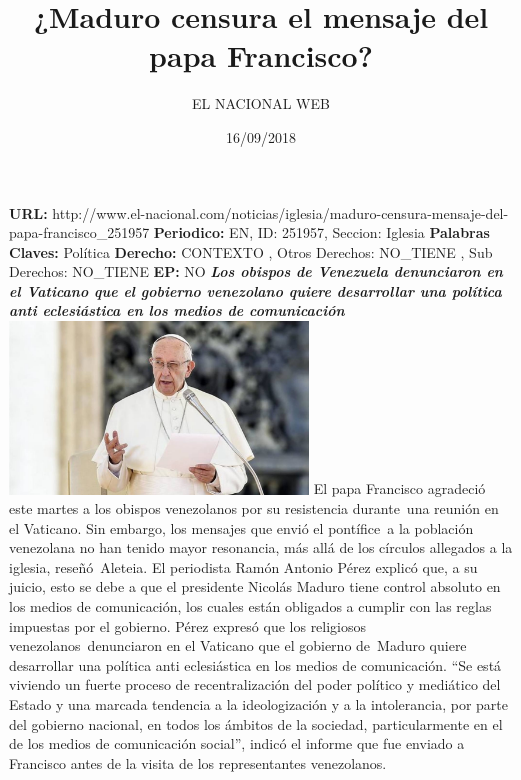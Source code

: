 \documentclass{article}%
\title{\textbf{¿Maduro censura el mensaje del papa Francisco?}}%
\author{EL NACIONAL WEB}%
\date{16/09/2018}%
\begin{document}
%
\normalsize%
\maketitle%
\textbf{URL: }%
http://www.el{-}nacional.com/noticias/iglesia/maduro{-}censura{-}mensaje{-}del{-}papa{-}francisco\_251957\newline%
%
\textbf{Periodico: }%
EN, %
ID: %
251957, %
Seccion: %
Iglesia\newline%
%
\textbf{Palabras Claves: }%
Política\newline%
%
\textbf{Derecho: }%
CONTEXTO%
, Otros Derechos: %
NO\_TIENE%
, Sub Derechos: %
NO\_TIENE%
\newline%
%
\textbf{EP: }%
NO\newline%
\newline%
%
\textbf{\textit{Los obispos de Venezuela denunciaron en el Vaticano que el gobierno venezolano quiere desarrollar una política anti eclesiástica en los medios de comunicación}}%
\newline%
\newline%
%
\includegraphics[width=300px]{179.jpg}%
\newline%
%
El papa Francisco agradeció este martes a los obispos venezolanos por su resistencia durante~una reunión en el Vaticano. Sin embargo, los mensajes que envió el pontífice~a la población venezolana no han tenido mayor resonancia, más allá de los círculos allegados a la iglesia, reseñó~Aleteia.%
\newline%
%
El periodista Ramón Antonio Pérez explicó que, a su juicio, esto se debe a que el presidente Nicolás Maduro tiene control absoluto en los medios de comunicación, los cuales están obligados a cumplir con las reglas impuestas por el gobierno.%
\newline%
%
Pérez expresó que los religiosos venezolanos~denunciaron en el Vaticano que el gobierno de~Maduro quiere desarrollar una política anti eclesiástica en los medios de comunicación.%
\newline%
%
“Se está viviendo un fuerte proceso de recentralización del poder político y mediático del Estado y una marcada tendencia a la ideologización y a la intolerancia, por parte del gobierno nacional, en todos los ámbitos de la sociedad, particularmente en el de los medios de comunicación social”, indicó el informe que fue enviado a Francisco antes de la visita de los representantes venezolanos.%
\end{document}
